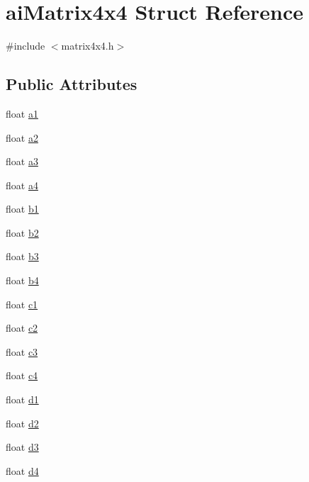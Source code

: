 \hypertarget{structai_matrix4x4}{\section{ai\-Matrix4x4 Struct Reference}
\label{structai_matrix4x4}
}


{\ttfamily \#include $<$matrix4x4.\-h$>$}

\subsection*{Public Attributes}
\begin{DoxyCompactItemize}
\item 
float \hyperlink{structai_matrix4x4_aeabb269b7ef332d3c69c14d8af3d531c}{a1}
\item 
float \hyperlink{structai_matrix4x4_a9d36d992ba3cfc814913e0225a04b91b}{a2}
\item 
float \hyperlink{structai_matrix4x4_a36f0d69cf678c3b5deea5a76f5624848}{a3}
\item 
float \hyperlink{structai_matrix4x4_a184e1a78f61c430aa7b0079b42e4c2a0}{a4}
\item 
float \hyperlink{structai_matrix4x4_a59667637f4d71bf4ebc1183bebe746fb}{b1}
\item 
float \hyperlink{structai_matrix4x4_af5dcecf706021b313239b7113cb80daa}{b2}
\item 
float \hyperlink{structai_matrix4x4_a0f0bf4dfcf9dd562d71d5ed5a5342316}{b3}
\item 
float \hyperlink{structai_matrix4x4_ae57a4a8b8f4509f5bdf90d7856c59281}{b4}
\item 
float \hyperlink{structai_matrix4x4_a63c847f6e86653143aa659f13c154e2b}{c1}
\item 
float \hyperlink{structai_matrix4x4_a67425f81054b1097c29b73bf317cfeeb}{c2}
\item 
float \hyperlink{structai_matrix4x4_aec8c5745b90139d472eb4e91f1373c1a}{c3}
\item 
float \hyperlink{structai_matrix4x4_a7e3288f38a4e00d55c02272e1582e462}{c4}
\item 
float \hyperlink{structai_matrix4x4_a13f3800d9106e3be6d0e60b794c5a5ae}{d1}
\item 
float \hyperlink{structai_matrix4x4_a6f17ca1c7e4b9377d0e332f85aab282b}{d2}
\item 
float \hyperlink{structai_matrix4x4_a8d2910f62b34b1e2ace93b55e4db4b92}{d3}
\item 
float \hyperlink{structai_matrix4x4_ac0a65b51f126f7331b4f7dbbd82f3d63}{d4}
\end{DoxyCompactItemize}


